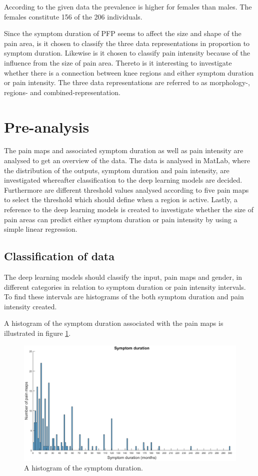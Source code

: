 \noindent
According to the given data the prevalence is higher for females than males. The females constitute 156 of the 206 individuals.


\noindent
Since the symptom duration of PFP seems to affect the size and shape of the pain area, is it chosen to classify the three data representations in proportion to symptom duration. Likewise is it chosen to classify pain intensity because of the influence from the size of pain area. Thereto is it interesting to investigate whether there is a connection between knee regions and either symptom duration or pain intensity.
The three data representations are referred to as morphology-, regions- and combined-representation.
\newpage

\section{Pre-analysis}
The pain maps and associated symptom duration as well as pain intensity are analysed to get an overview of the data. The data is analysed in MatLab, where the distribution of the outputs, symptom duration and pain intensity, are investigated whereafter classification to the deep learning models are decided. Furthermore are different threshold values analysed according to five pain maps to select the threshold which should define when a region is active. Lastly, a reference to the deep learning models is created to investigate whether the size of pain areas can predict either symptom duration or pain intensity by using a simple linear regression.


\subsection{Classification of data}
The deep learning models should classify the input, pain maps and gender, in different categories in relation to symptom duration or pain intensity intervals. To find these intervals are histograms of the both symptom duration and pain intensity created.

\noindent
A histogram of the symptom duration associated with the pain maps is illustrated in figure \ref{fig:histoduration}.

\begin{figure} [H]
\centering
\includegraphics[width=1\textwidth]{figures/histogramDuration}
\caption{A histogram of the symptom duration.}
\label{fig:histoduration}
\end{figure}

